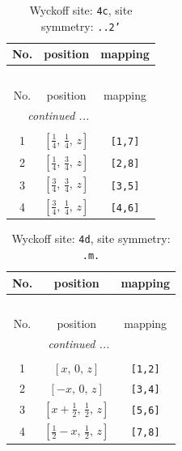 \documentclass[fleqn,8pt]{jsarticle}
\begin{document}
\begin{longtable}{ccc}
\caption{Wyckoff site: {\tt 4c}, site symmetry: {\tt ..2'}}
 \\
 \hline \hline
No. & position & mapping \\ \hline \endfirsthead

\multicolumn{2}{l}{\tablename\ \thetable{}} \\
 \hline \hline
No. & position & mapping \\ \hline \endhead

 \hline \hline
\multicolumn{2}{r}{\footnotesize\it continued ...} \\ \endfoot

 \hline \hline
\multicolumn{2}{r}{} \\ \endlastfoot

1 & $\left[ \frac{1}{4},\, \frac{1}{4},\, z \right]$ & {\tt [1,7]} \\ \hline
2 & $\left[ \frac{1}{4},\, \frac{3}{4},\, z \right]$ & {\tt [2,8]} \\ \hline
3 & $\left[ \frac{3}{4},\, \frac{3}{4},\, z \right]$ & {\tt [3,5]} \\ \hline
4 & $\left[ \frac{3}{4},\, \frac{1}{4},\, z \right]$ & {\tt [4,6]} \\
\end{longtable}
\renewcommand{\arraystretch}{1.2}
\begin{longtable}{ccc}
\caption{Wyckoff site: {\tt 4d}, site symmetry: {\tt .m.}}
 \\
 \hline \hline
No. & position & mapping \\ \hline \endfirsthead

\multicolumn{2}{l}{\tablename\ \thetable{}} \\
 \hline \hline
No. & position & mapping \\ \hline \endhead

 \hline \hline
\multicolumn{2}{r}{\footnotesize\it continued ...} \\ \endfoot

 \hline \hline
\multicolumn{2}{r}{} \\ \endlastfoot

1 & $\left[ x,\, 0,\, z \right]$ & {\tt [1,2]} \\ \hline
2 & $\left[ - x,\, 0,\, z \right]$ & {\tt [3,4]} \\ \hline
3 & $\left[ x + \frac{1}{2},\, \frac{1}{2},\, z \right]$ & {\tt [5,6]} \\ \hline
4 & $\left[ \frac{1}{2} - x,\, \frac{1}{2},\, z \right]$ & {\tt [7,8]} \\
\end{longtable}
\end{document}
